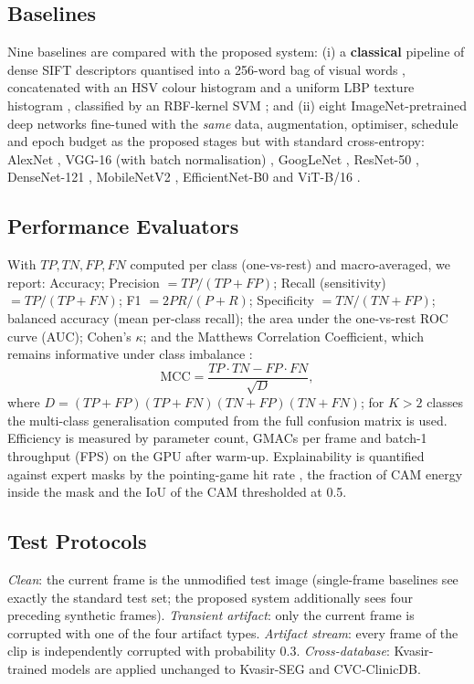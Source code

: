 \documentclass[conference]{IEEEtran}
\begin{document}
\subsection{Baselines}
Nine baselines are compared with the proposed system: (i) a \textbf{classical} pipeline of dense SIFT
\cite{lowe2004sift} descriptors quantised into a 256-word bag of visual words \cite{csurka2004bovw}, concatenated with
an HSV colour histogram and a uniform LBP texture histogram \cite{ojala2002lbp}, classified by an RBF-kernel SVM
\cite{cortes1995svm}; and (ii) eight ImageNet-pretrained deep networks fine-tuned with the \emph{same} data,
augmentation, optimiser, schedule and epoch budget as the proposed stages but with standard cross-entropy: AlexNet
\cite{krizhevsky2012imagenet}, VGG-16 (with batch normalisation) \cite{simonyan2014very}, GoogLeNet
\cite{szegedy2015going}, ResNet-50 \cite{he2016deep}, DenseNet-121 \cite{huang2017densely}, MobileNetV2
\cite{sandler2018mobilenetv2}, EfficientNet-B0 \cite{tan2019efficientnet} and ViT-B/16 \cite{dosovitskiy2020image}.

\subsection{Performance Evaluators}
With $TP, TN, FP, FN$ computed per class (one-vs-rest) and macro-averaged, we report: Accuracy;
Precision $=TP/(TP+FP)$; Recall (sensitivity) $=TP/(TP+FN)$; F1 $=2PR/(P+R)$; Specificity $=TN/(TN+FP)$; balanced
accuracy (mean per-class recall); the area under the one-vs-rest ROC curve (AUC); Cohen's $\kappa$; and the Matthews
Correlation Coefficient, which remains informative under class imbalance \cite{chicco2020mcc}:
\begin{equation}
    \text{MCC} = \frac{TP \cdot TN - FP \cdot FN}{\sqrt{D}},
\end{equation}
where $D = (TP+FP)(TP+FN)(TN+FP)(TN+FN)$; for $K>2$ classes the multi-class generalisation computed from the full
confusion matrix is used. Efficiency is measured by parameter count, GMACs per frame and batch-1 throughput (FPS) on
the GPU after warm-up. Explainability is quantified against expert masks by the pointing-game hit rate
\cite{zhang2018pointing}, the fraction of CAM energy inside the mask and the IoU of the CAM thresholded at 0.5.

\subsection{Test Protocols}
\emph{Clean}: the current frame is the unmodified test image (single-frame baselines see exactly the standard test
set; the proposed system additionally sees four preceding synthetic frames). \emph{Transient artifact}: only the
current frame is corrupted with one of the four artifact types. \emph{Artifact stream}: every frame of the clip is
independently corrupted with probability 0.3. \emph{Cross-database}: Kvasir-trained models are applied unchanged to
Kvasir-SEG and CVC-ClinicDB.
\end{document}
